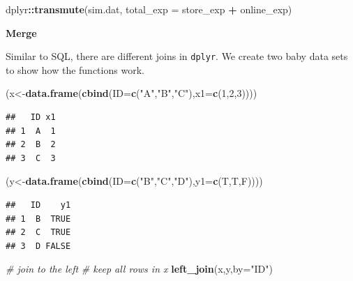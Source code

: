 \documentclass[12pt,]{krantz}
\newenvironment{Shaded}{\begin{snugshade}}{\end{snugshade}}
\newcommand{\KeywordTok}[1]{\textcolor[rgb]{0.13,0.29,0.53}{\textbf{#1}}}
\newcommand{\DataTypeTok}[1]{\textcolor[rgb]{0.13,0.29,0.53}{#1}}
\newcommand{\DecValTok}[1]{\textcolor[rgb]{0.00,0.00,0.81}{#1}}
\newcommand{\StringTok}[1]{\textcolor[rgb]{0.31,0.60,0.02}{#1}}
\newcommand{\CommentTok}[1]{\textcolor[rgb]{0.56,0.35,0.01}{\textit{#1}}}
\newcommand{\OperatorTok}[1]{\textcolor[rgb]{0.81,0.36,0.00}{\textbf{#1}}}
\newcommand{\NormalTok}[1]{#1}
\theoremstyle{definition}
\theoremstyle{definition}
\theoremstyle{definition}
\theoremstyle{remark}
\begin{document}
\begin{Shaded}
\begin{Highlighting}[]
\NormalTok{dplyr}\OperatorTok{::}\KeywordTok{transmute}\NormalTok{(sim.dat, }\DataTypeTok{total_exp =}\NormalTok{ store_exp }\OperatorTok{+}\StringTok{ }\NormalTok{online_exp) }
\end{Highlighting}
\end{Shaded}

\textbf{Merge}

Similar to SQL, there are different joins in \texttt{dplyr}. We create
two baby data sets to show how the functions work.

\begin{Shaded}
\begin{Highlighting}[]
\NormalTok{(x<-}\KeywordTok{data.frame}\NormalTok{(}\KeywordTok{cbind}\NormalTok{(}\DataTypeTok{ID=}\KeywordTok{c}\NormalTok{(}\StringTok{"A"}\NormalTok{,}\StringTok{"B"}\NormalTok{,}\StringTok{"C"}\NormalTok{),}\DataTypeTok{x1=}\KeywordTok{c}\NormalTok{(}\DecValTok{1}\NormalTok{,}\DecValTok{2}\NormalTok{,}\DecValTok{3}\NormalTok{))))}
\end{Highlighting}
\end{Shaded}

\begin{verbatim}
##   ID x1
## 1  A  1
## 2  B  2
## 3  C  3
\end{verbatim}

\begin{Shaded}
\begin{Highlighting}[]
\NormalTok{(y<-}\KeywordTok{data.frame}\NormalTok{(}\KeywordTok{cbind}\NormalTok{(}\DataTypeTok{ID=}\KeywordTok{c}\NormalTok{(}\StringTok{"B"}\NormalTok{,}\StringTok{"C"}\NormalTok{,}\StringTok{"D"}\NormalTok{),}\DataTypeTok{y1=}\KeywordTok{c}\NormalTok{(T,T,F))))}
\end{Highlighting}
\end{Shaded}

\begin{verbatim}
##   ID    y1
## 1  B  TRUE
## 2  C  TRUE
## 3  D FALSE
\end{verbatim}

\begin{Shaded}
\begin{Highlighting}[]
\CommentTok{# join to the left}
\CommentTok{# keep all rows in x}
\KeywordTok{left_join}\NormalTok{(x,y,}\DataTypeTok{by=}\StringTok{"ID"}\NormalTok{)}
\end{Highlighting}
\end{Shaded}
\end{document}
